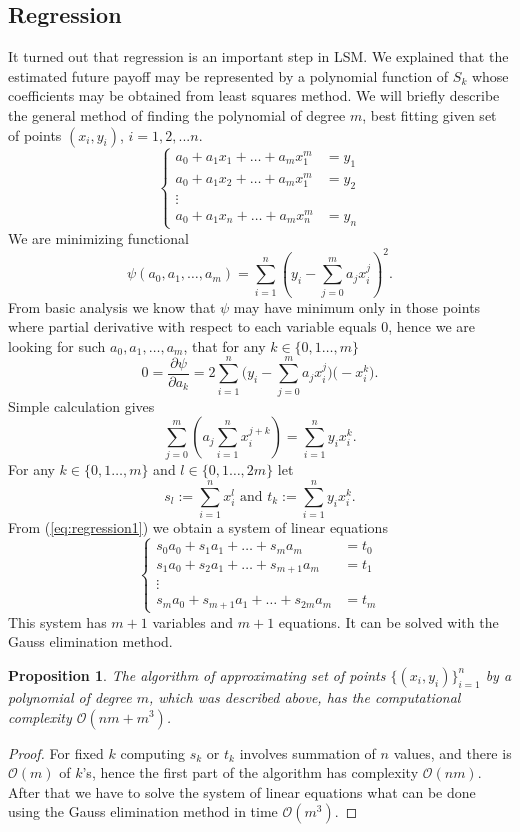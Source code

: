 \documentclass[a4paper,12pt, oneside]{book}
\newtheorem{prop}[thm]{Proposition}
\theoremstyle{definition}
\theoremstyle{remark}
\begin{document}
\subsection{Regression}
It turned out that regression is an important step in LSM. We explained that the estimated future payoff may be represented by a polynomial function of $S_k$ whose coefficients may be obtained from least squares method. We will briefly describe the general method of finding the polynomial of degree $m$, best fitting given set of points $(x_i, y_i)$, $i=1,2,...n$.
\[ \begin{cases}
    a_0 + a_1 x_1 + \ldots + a_m x_1^m &= y_1 \\
    a_0 + a_1 x_2 + \ldots + a_m x_1^m &= y_2 \\
    \vdots & \\
    a_0 + a_1 x_n + \ldots + a_m x_n^m &= y_n
   \end{cases}
\]
We are minimizing functional
\[ \psi(a_0,a_1,\ldots,a_m) = \sum\limits_{i=1}^n \left( y_i - \sum\limits_{j=0}^m a_jx_i^j \right)^2. \]
From basic analysis we know that $\psi$ may have minimum only in those points where partial derivative with respect to each variable equals 0, hence we are looking for such $a_0,a_1,\ldots,a_m$, that for any $k \in \{0,1\ldots,m\}$
\[ 0 = \frac{\partial \psi}{\partial a_k} = 2  \sum\limits_{i=1}^n \bigl( y_i - \sum\limits_{j=0}^m a_jx_i^j \bigr) \bigl( -x_i^k \bigr). \]
Simple calculation gives
\begin{equation}
 \label{eq:regression1}
 \sum\limits_{j=0}^m \left( a_j \sum\limits_{i=1}^n  x_i^{j+k} \right) = \sum\limits_{i=1}^n y_i x_i^k. 
\end{equation}
For any $k \in \{0,1\ldots,m\}$ and $l \in \{0,1\ldots,2m\}$ let
\[ s_{l} := \sum\limits_{i=1}^n  x_i^l \text{\ \ \ and \ \ } t_k := \sum\limits_{i=1}^n y_i x_i^k .\]
From (\ref{eq:regression1}) we obtain a system of linear equations
\begin{equation}
 \label{eq:regression2}
 \begin{cases}
  s_0 a_0 + s_1 a_1 + \ldots + s_m a_m &= t_0 \\
  s_1 a_0 + s_2 a_1 + \ldots + s_{m+1} a_m &= t_1 \\
    \vdots & \\
  s_m a_0 + s_{m+1} a_1 + \ldots + s_{2m} a_m &= t_m
  \end{cases}
\end{equation}
This system has $m+1$ variables and $m+1$ equations. It can be solved with the Gauss elimination method.
\begin{prop}
 The algorithm of approximating set of points $\{ (x_i,y_i) \}_{i=1}^n$ by a polynomial of degree $m$, which was described above, has the computational complexity \mbox{$\mathcal{O}(nm + m^3)$}.
\end{prop}
\begin{proof}
 For fixed $k$ computing $s_k$ or $t_k$ involves summation of $n$ values, and there is $\mathcal{O}(m)$ of $k$'s, hence the first part of the algorithm  has complexity $\mathcal{O}(nm)$. After that we have to solve the system of linear equations what can be done using the Gauss elimination method in time $\mathcal{O}(m^3)$.
\end{proof}
\end{document}
